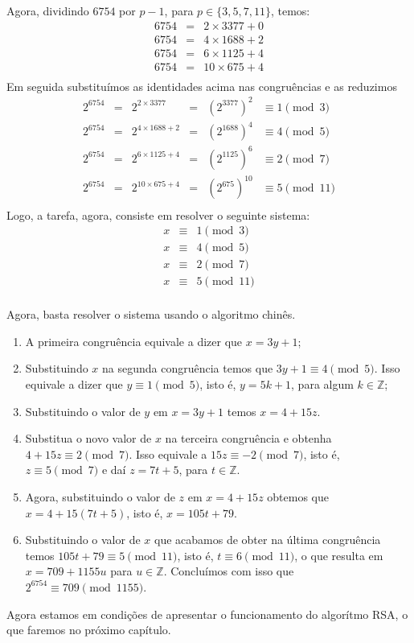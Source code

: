 Agora, dividindo $6754$ por $p-1$, para $p\in\{3, 5, 7, 11\}$, temos:
\[
\begin{array}{ccl}
  6754 & = & 2 \times 3377 + 0 \\  
	6754 & = & 4 \times 1688 + 2 \\
  6754 & = & 6 \times 1125 + 4 \\
  6754 & = & 10 \times 675 + 4 \\ 
\end{array}
\]
Em seguida substitu\'imos as identidades acima nas congru\^encias e as reduzimos
\[
\begin{array}{cccccc}
2^{6754} & = & 2^{2\times 3377}   & = & (2^{3377})^{2} & \equiv 1 \pmod{3} \\  
2^{6754} & = & 2^{4\times 1688+2} & = & (2^{1688})^{4} & \equiv 4 \pmod{5}\\  
2^{6754} & = & 2^{6\times 1125+4} & = & (2^{1125})^{6} & \equiv 2 \pmod{7}\\ 
2^{6754} & = & 2^{10\times 675+4} & = & (2^{675})^{10} & \equiv 5 \pmod{11}\\  
\end{array}
\]
Logo, a tarefa, agora, consiste em resolver o seguinte sistema:
\[
\begin{array}{ccc}
  x & \equiv & 1 \pmod{3}\\
  x & \equiv & 4 \pmod{5}\\
  x & \equiv & 2 \pmod{7}\\
  x & \equiv & 5 \pmod{11}\\  
\end{array}
\]

Agora, basta resolver o sistema usando o algoritmo chin\^{e}s. 
\begin{enumerate}
\item A primeira congru\^{e}ncia equivale a dizer que $x = 3y + 1$; 
\item Substituindo $x$ na segunda congru\^encia temos que $3y + 1 \equiv 4 \pmod{5}$. Isso equivale a dizer que $y \equiv 1 \pmod{5}$, 
isto \'{e}, $y=5k+1$, para algum $k\in\mathbb{Z}$; 
\item Substituindo o valor de $y$ em $x=3y+1$ temos $x=4+15z$.
\item Substitua o novo valor de $x$ na terceira congru\^{e}ncia e obtenha $4+15z\equiv 2\pmod{7}$. Isso equivale a
      $15z\equiv -2\pmod{7}$, isto \'{e}, $z\equiv 5\pmod{7}$ e da\'{i} $z=7t+5$, para $t\in\mathbb{Z}$.
\item Agora, substituindo o valor de $z$ em $x=4+15z$ obtemos que $x=4+15(7t+5)$, isto \'{e}, $x=105t+79$.
\item Substituindo o valor de $x$ que acabamos de obter na \'{u}ltima congru\^{e}ncia temos 
      $105t+79\equiv 5 \pmod{11}$, isto \'{e},  $t\equiv 6 \pmod{11}$, o que resulta em 
				$x = 709+1155u$ para $u\in\mathbb{Z}$. Conclu\'imos com isso que $2^{6754} \equiv 709 \pmod{1155}$.
\end{enumerate}

Agora estamos em condi\c{c}\~{o}es de apresentar o funcionamento do algor\'{i}tmo RSA, o que faremos no pr\'{o}ximo cap\'{i}tulo. 